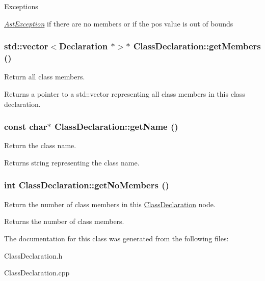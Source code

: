 \begin{DoxyExceptions}{Exceptions}
\item[{\em \hyperlink{classAstException}{AstException}}]if there are no members or if the pos value is out of bounds \end{DoxyExceptions}
\hypertarget{classClassDeclaration_ac52a79fdbdf26dd21327c54632d9d452}{
\subsubsection[{getMembers}]{\setlength{\rightskip}{0pt plus 5cm}std::vector$<${\bf Declaration} $\ast$$>$$\ast$ ClassDeclaration::getMembers ()}}
\label{classClassDeclaration_ac52a79fdbdf26dd21327c54632d9d452}
Return all class members.

\begin{DoxyReturn}{Returns}
a pointer to a std::vector representing all class members in this class declaration. 
\end{DoxyReturn}
\hypertarget{classClassDeclaration_aee9941ff0bc3f063352dc9150c8f4733}{
\subsubsection[{getName}]{\setlength{\rightskip}{0pt plus 5cm}const char$\ast$ ClassDeclaration::getName ()}}
\label{classClassDeclaration_aee9941ff0bc3f063352dc9150c8f4733}
Return the class name.

\begin{DoxyReturn}{Returns}
string representing the class name. 
\end{DoxyReturn}
\hypertarget{classClassDeclaration_ae2b6695aa4eee03d8516637535ec4907}{
\subsubsection[{getNoMembers}]{\setlength{\rightskip}{0pt plus 5cm}int ClassDeclaration::getNoMembers ()}}
\label{classClassDeclaration_ae2b6695aa4eee03d8516637535ec4907}
Return the number of class members in this \hyperlink{classClassDeclaration}{ClassDeclaration} node.

\begin{DoxyReturn}{Returns}
the number of class members. 
\end{DoxyReturn}


The documentation for this class was generated from the following files:\begin{DoxyCompactItemize}
\item 
ClassDeclaration.h\item 
ClassDeclaration.cpp\end{DoxyCompactItemize}
